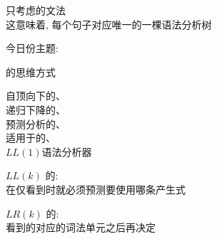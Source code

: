 
\begin{frame}{}
  \begin{center}
    只考虑的文法 \\[4pt]
    这意味着, 每个句子对应唯一的一棵语法分析树


    今日份主题: 
  \end{center}
\end{frame}

\begin{frame}{}
  \begin{center}
    的思维方式
  \end{center}
\end{frame}

\begin{frame}{}
  \begin{center}
    自顶向下的、\\[15pt]
    递归下降的、\\[15pt]
    预测分析的、\\[15pt]
    适用于的、\\[15pt]
    $LL(1)$语法分析器
  \end{center}
\end{frame}

\begin{frame}{}
  \begin{center}
    $LL(k)$ 的: \\[10pt]
    在仅看到时就必须预测要使用哪条产生式

    \pause
    \vspace{1.50cm}
    $LR(k)$ 的: \\[10pt]
    看到的对应的词法单元之后再决定
  \end{center}
\end{frame}
